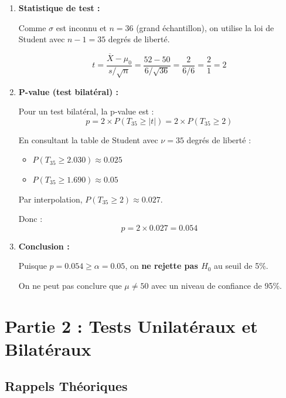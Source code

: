 \documentclass[11pt,a4paper]{article}
\begin{document}
\begin{enumerate}
    \item \textbf{Statistique de test :}
    
    Comme $\sigma$ est inconnu et $n = 36$ (grand échantillon), on utilise la loi de Student avec $n-1 = 35$ degrés de liberté.
    
    $$t = \frac{\overline{X} - \mu_0}{s/\sqrt{n}} = \frac{52 - 50}{6/\sqrt{36}} = \frac{2}{6/6} = \frac{2}{1} = 2$$
    
    \item \textbf{P-value (test bilatéral) :}
    
    Pour un test bilatéral, la p-value est :
    $$p = 2 \times P(T_{35} \geq |t|) = 2 \times P(T_{35} \geq 2)$$
    
    En consultant la table de Student avec $\nu = 35$ degrés de liberté :
    \begin{itemize}
        \item $P(T_{35} \geq 2.030) \approx 0.025$
        \item $P(T_{35} \geq 1.690) \approx 0.05$
    \end{itemize}
    
    Par interpolation, $P(T_{35} \geq 2) \approx 0.027$.
    
    Donc : $$p = 2 \times 0.027 = 0.054$$
    
    \item \textbf{Conclusion :}
    
    Puisque $p = 0.054 \geq \alpha = 0.05$, on \textbf{ne rejette pas $H_0$} au seuil de 5\%.
    
    On ne peut pas conclure que $\mu \neq 50$ avec un niveau de confiance de 95\%.
\end{enumerate}

\newpage

\section{Partie 2 : Tests Unilatéraux et Bilatéraux}

\subsection{Rappels Théoriques}
\end{document}

